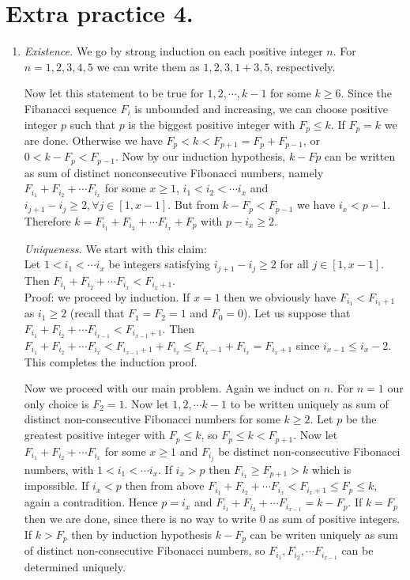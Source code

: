 \documentclass[11pt]{article}
\begin{document}
\section {Extra practice 4.}
\begin{enumerate}
\item \emph {Existence.}
We go by strong induction on each positive integer $n$. For $n=1,2,3,4,5$ we can write them as $1,2,3,1+3,5$, respectively.

Now let this statement to be true for $1,2,\cdots , k-1$ for some $k\ge 6$. Since the Fibanacci sequence $F_i$ is unbounded and increasing, we can choose positive integer $p$ such that $p$ is the biggest positive integer with $F_p\le k.$ If $F_p=k$ we are done. Otherwise we have $F_p<k<F_{p+1}=F_p+F_{p-1}$, or $0<k-F_{p}<F_{p-1}$. Now by our induction hypothesis, $k-F{p}$ can be written as sum of distinct nonconsecutive Fibonacci numbers, namely $F_{i_1}+F_{i_2}+\cdots F_{i_x}$ for some $x\ge 1$, $i_1<i_2<\cdots i_x$ and $i_{j+1}-i_j\ge 2, \forall j\in [1,x-1]$. But from $k-F_p<F_{p-1}$ we have $i_x<p-1$. Therefore $k=F_{i_1}+F_{i_2}+\cdots F_{i_x}+F_p$ with $p-i_x\ge 2$.

\emph {Uniqueness.} We start with this claim:\\
Let $1<i_1<\cdots i_x$ be integers satisfying $i_{j+1}-i_j\ge 2$ for all $j\in [1,x-1].$ Then $F_{i_1}+F_{i_2}+\cdots F_{i_x}<F_{i_{x}+1}$.\\
Proof: we proceed by induction. If $x=1$ then we obviously have $F_{i_1}<F_{i_1+1}$ as $i_1\ge 2$ (recall that $F_1=F_2=1$ and $F_0=0$). Let us suppose that $F_{i_1}+F_{i_2}+\cdots F_{i_{x-1}}<F_{i_{x-1}+1}$. Then $F_{i_1}+F_{i_2}+\cdots F_{i_x}<F_{i_{x-1}+1}+F_{i_x}\le F_{i_{x}-1}+F_{i_x}=F_{i_{x}+1}$ since $i_{x-1}\le i_x-2$. This completes the induction proof.

Now we proceed with our main problem. Again we induct on $n$. For $n=1$ our only choice is $F_2=1$. Now let $1,2,\cdots k-1$ to be written uniquely as sum of distinct non-consecutive Fibonacci numbers for some $k\ge 2$. Let $p$ be the greatest positive integer with $F_p\le k$, so $F_p\le k<F_{p+1}$. Now let $F_{i_1}+F_{i_2}+\cdots F_{i_x}$ for some $x\ge 1$ and $F_{i_j}$ be distinct non-consecutive Fibonacci numbers, with $1<i_1<\cdots i_x$. If $i_x>p$ then $F_{i_x}\ge F_{p+1}>k$ which is impossible. If $i_x<p$ then from above $F_{i_1}+F_{i_2}+\cdots F_{i_x}<F_{i_{x}+1}\le F_p\le k,$ again a contradition. Hence $p=i_x$ and $F_{i_1}+F_{i_2}+\cdots F_{i_{x-1}}=k-F_p.$ If $k=F_p$ then we are done, since there is no way to write 0 as sum of positive integers. If $k>F_p$ then by induction hypothesis $k-F_p$ can be writen uniquely as sum of distinct non-consecutive Fibonacci numbers, so $F_{i_1},F_{i_2},\cdots F_{i_{x-1}}$ can be determined uniquely.

\end{enumerate}
\end{document}
